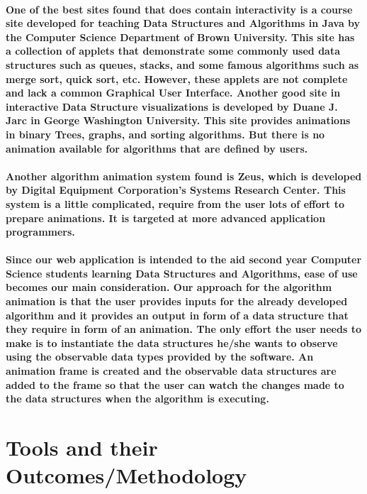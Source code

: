 \documentclass{article}
\begin{document}
\paragraph{One of the best sites found that does contain interactivity is a course site developed for teaching Data Structures and Algorithms in Java by the Computer Science Department of Brown University. This site has a collection of applets that demonstrate some commonly used data structures such as queues, stacks, and some famous algorithms such as merge sort, quick sort, etc. However, these applets are not complete and lack a common Graphical User Interface. Another good site in interactive Data Structure visualizations is developed by Duane J. Jarc in George Washington University\cite{jarc1998empirical}. This site provides animations in binary Trees, graphs, and sorting algorithms. But there is no animation available for algorithms that are defined by users.}
\paragraph{Another algorithm animation system found is Zeus, which is developed by Digital Equipment Corporation's Systems Research Center\cite{brown1993algorithm}. This system is a little complicated, require from the user lots of effort to prepare animations. It is targeted at more advanced application programmers.}
\paragraph{Since our web application is intended to the aid second year Computer Science students learning Data Structures and Algorithms, ease of use becomes our main consideration. Our approach for the algorithm animation is that the user provides inputs for the already developed algorithm and it provides an output in form of a data structure that they require in form of an animation. \cite{gupta2014introduction}The only effort the user needs to make is to instantiate the data structures he/she wants to observe using the observable data types provided by the software. An animation frame is created and the observable data structures are added to the frame so that the user can watch the changes made to the data structures when the algorithm is executing.}



\section{Tools and their Outcomes/Methodology}
\end{document}
